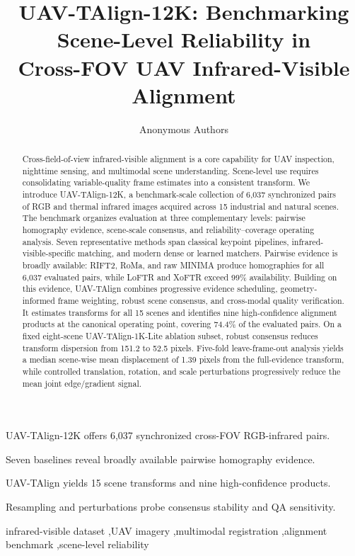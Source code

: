 \documentclass[preprint,12pt]{elsarticle}
\begin{document}
\begin{frontmatter}

\title{UAV-TAlign-12K: Benchmarking Scene-Level Reliability in\\ Cross-FOV UAV Infrared-Visible Alignment}

\author[anon]{Anonymous Authors}

\begin{abstract}
Cross-field-of-view infrared-visible alignment is a core capability for UAV inspection, nighttime
sensing, and multimodal scene understanding. Scene-level use requires consolidating variable-quality
frame estimates into a consistent transform. We introduce UAV-TAlign-12K, a benchmark-scale
collection of 6,037 synchronized pairs of RGB and thermal infrared images acquired across 15 industrial and natural
scenes. The benchmark organizes
evaluation at three complementary levels: pairwise homography evidence, scene-scale consensus,
and reliability--coverage operating analysis. Seven representative methods span classical
keypoint pipelines, infrared-visible-specific matching, and modern dense or learned matchers.
Pairwise evidence is broadly available: RIFT2, RoMa, and raw MINIMA produce homographies for all
6,037 evaluated pairs, while LoFTR and XoFTR exceed 99\% availability. Building on this evidence,
UAV-TAlign combines progressive evidence scheduling, geometry-informed frame weighting, robust
scene consensus, and cross-modal quality verification. It estimates transforms for all 15 scenes
and identifies nine high-confidence alignment products at the canonical operating point, covering
74.4\% of the evaluated pairs. On a fixed eight-scene UAV-TAlign-1K-Lite ablation subset, robust
consensus reduces transform dispersion from 151.2 to 52.5 pixels.
Five-fold leave-frame-out analysis yields a median scene-wise mean
displacement of 1.39 pixels from the full-evidence transform, while controlled translation, rotation,
and scale perturbations progressively reduce the mean joint edge/gradient signal.
\end{abstract}

\begin{highlights}
\item UAV-TAlign-12K offers 6,037 synchronized cross-FOV RGB-infrared pairs.
\item Seven baselines reveal broadly available pairwise homography evidence.
\item UAV-TAlign yields 15 scene transforms and nine high-confidence products.
\item Resampling and perturbations probe consensus stability and QA sensitivity.
\end{highlights}

\begin{keyword}
infrared-visible dataset \sep UAV imagery \sep multimodal registration \sep alignment benchmark \sep scene-level reliability
\end{keyword}

\end{frontmatter}
\end{document}

